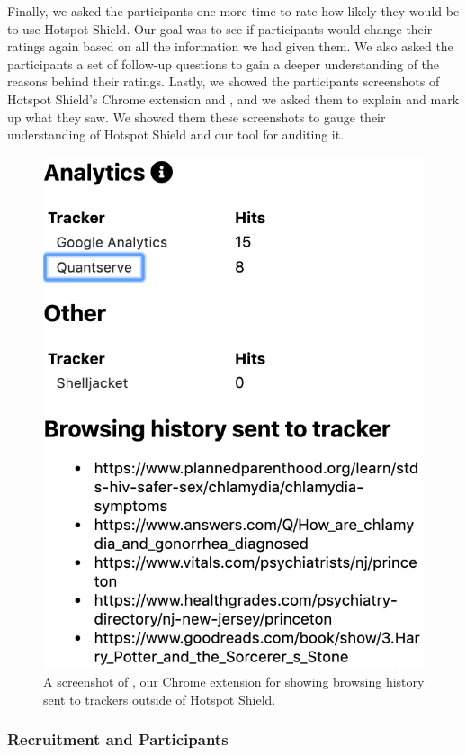 Finally, we asked the participants one more time to rate how likely they would
be to use Hotspot Shield.  Our goal was to see if participants would change
their ratings again based on all the information we had given them.  We also
asked the participants a set of follow-up questions to gain a deeper
understanding of the reasons behind their ratings.  Lastly, we showed the
participants screenshots of Hotspot Shield's Chrome extension and \tool,
and we asked them to explain and mark up what they saw.  We showed them these
screenshots to gauge their understanding of Hotspot Shield and our tool for
auditing it.



\begin{figure}[t]
    \includegraphics[width=0.85\linewidth]{sections/figures/vpn-audit.png}
    \caption{A screenshot of \tool, our Chrome extension for showing browsing history sent to trackers outside of Hotspot Shield.}
    \label{fig:vpn-audit}
\end{figure}


\subsubsection{Recruitment and Participants} 


